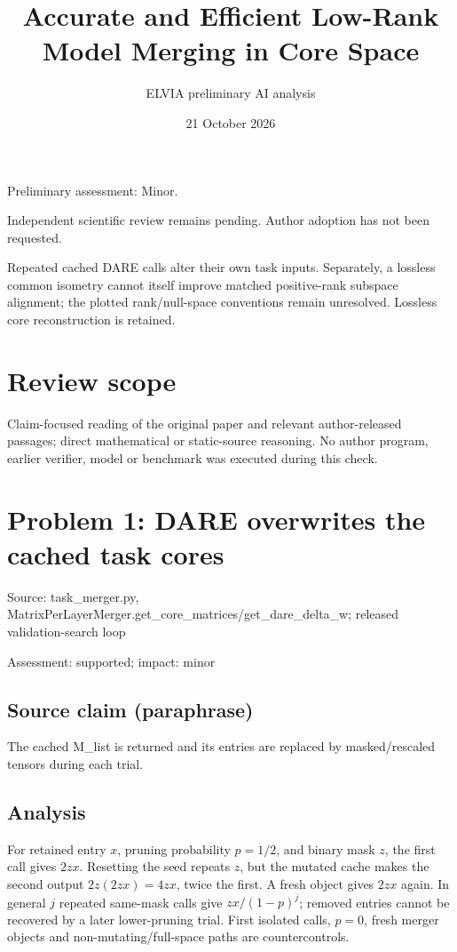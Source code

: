 \documentclass[11pt]{article}
\begin{document}
\title{Accurate and Efficient Low-Rank Model Merging in Core Space}

\author{ELVIA preliminary AI analysis}\date{21 October 2026}\maketitle

Preliminary assessment: Minor.\par

Independent scientific review remains pending. Author adoption has not been requested.

Repeated cached DARE calls alter their own task inputs. Separately, a lossless common isometry cannot itself improve matched positive-rank subspace alignment; the plotted rank/null-space conventions remain unresolved. Lossless core reconstruction is retained.

\section*{Review scope}

Claim-focused reading of the original paper and relevant author-released passages; direct mathematical or static-source reasoning. No author program, earlier verifier, model or benchmark was executed during this check.

\section*{Problem 1: DARE overwrites the cached task cores}

Source: task\_merger.py, MatrixPerLayerMerger.get\_core\_matrices/get\_dare\_delta\_w; released validation-search loop

Assessment: supported; impact: minor

\subsection*{Source claim (paraphrase)}

The cached M\_list is returned and its entries are replaced by masked/rescaled tensors during each trial.

\subsection*{Analysis}

For retained entry \(x\), pruning probability \(p=1/2\), and binary mask \(z\), the first call gives \(2zx\). Resetting the seed repeats \(z\), but the mutated cache makes the second output \(2z(2zx)=4zx\), twice the first. A fresh object gives \(2zx\) again. In general \(j\) repeated same-mask calls give \(zx/(1-p)^j\); removed entries cannot be recovered by a later lower-pruning trial. First isolated calls, \(p=0\), fresh merger objects and non-mutating/full-space paths are countercontrols.
\end{document}
